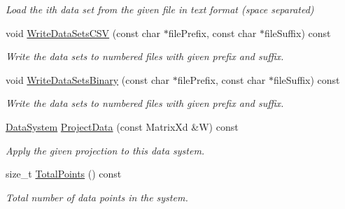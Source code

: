 \begin{DoxyCompactItemize}
\begin{DoxyCompactList}\small\item\em Load the ith data set from the given file in text format (space separated) \end{DoxyCompactList}\item 
\hypertarget{struct_d_r_d_s_p_1_1_data_system_a6b4e0e6bc3ba1135a08fc2c2ed874e39}{void \hyperlink{struct_d_r_d_s_p_1_1_data_system_a6b4e0e6bc3ba1135a08fc2c2ed874e39}{Write\-Data\-Sets\-C\-S\-V} (const char $\ast$file\-Prefix, const char $\ast$file\-Suffix) const }\label{struct_d_r_d_s_p_1_1_data_system_a6b4e0e6bc3ba1135a08fc2c2ed874e39}

\begin{DoxyCompactList}\small\item\em Write the data sets to numbered files with given prefix and suffix. \end{DoxyCompactList}\item 
\hypertarget{struct_d_r_d_s_p_1_1_data_system_ac05f637ae6b77c109ac004cad87bacb4}{void \hyperlink{struct_d_r_d_s_p_1_1_data_system_ac05f637ae6b77c109ac004cad87bacb4}{Write\-Data\-Sets\-Binary} (const char $\ast$file\-Prefix, const char $\ast$file\-Suffix) const }\label{struct_d_r_d_s_p_1_1_data_system_ac05f637ae6b77c109ac004cad87bacb4}

\begin{DoxyCompactList}\small\item\em Write the data sets to numbered files with given prefix and suffix. \end{DoxyCompactList}\item 
\hypertarget{struct_d_r_d_s_p_1_1_data_system_afd5e714d21c0d7c1b1efb65b233788ab}{\hyperlink{struct_d_r_d_s_p_1_1_data_system}{Data\-System} \hyperlink{struct_d_r_d_s_p_1_1_data_system_afd5e714d21c0d7c1b1efb65b233788ab}{Project\-Data} (const Matrix\-Xd \&W) const }\label{struct_d_r_d_s_p_1_1_data_system_afd5e714d21c0d7c1b1efb65b233788ab}

\begin{DoxyCompactList}\small\item\em Apply the given projection to this data system. \end{DoxyCompactList}\item 
\hypertarget{struct_d_r_d_s_p_1_1_data_system_a952b433226cdd312620db7140fe352ce}{size\-\_\-t \hyperlink{struct_d_r_d_s_p_1_1_data_system_a952b433226cdd312620db7140fe352ce}{Total\-Points} () const }\label{struct_d_r_d_s_p_1_1_data_system_a952b433226cdd312620db7140fe352ce}

\begin{DoxyCompactList}\small\item\em Total number of data points in the system. \end{DoxyCompactList}\end{DoxyCompactItemize}
